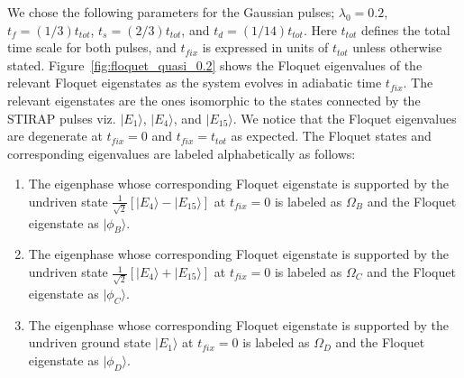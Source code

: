 \documentclass{article}
\begin{document}
We chose the following parameters for the Gaussian pulses;  $\lambda_0=0.2$, $t_f=(1/3) t_{tot}$, $t_s=(2/3)t_{tot}$, and $t_d=(1/14)t_{tot}$. Here $t_{tot}$ defines the total time scale for both pulses, and $t_{fix}$ is expressed in units of $t_{tot}$ unless otherwise stated. Figure~\ref{fig:floquet_quasi_0.2} shows the Floquet eigenvalues of the relevant Floquet eigenstates as the system evolves in adiabatic time $t_{fix}$. The relevant eigenstates are the ones isomorphic to the states connected by the STIRAP pulses viz. $|E_1\rangle$, $|E_4\rangle$, and $|E_{15}\rangle$. We notice that the Floquet eigenvalues are degenerate at $t_{fix}=0$ and $t_{fix}=t_{tot}$ as expected.  The Floquet states and corresponding eigenvalues are labeled alphabetically as follows:
\begin{enumerate}
\item
The eigenphase whose corresponding Floquet eigenstate is supported by the undriven state $\frac{1}{\sqrt{2}}\left[|E_4\rangle - |E_{15}\rangle \right]$ at $t_{fix}=0$ is labeled as $\Omega_B$ and the Floquet eigenstate as $|\phi_B\rangle$.
\item
The eigenphase whose corresponding Floquet eigenstate is supported by the undriven state $\frac{1}{\sqrt{2}}\left[|E_4\rangle + |E_{15}\rangle \right]$ at $t_{fix}=0$  is labeled as $\Omega_C$ and the Floquet eigenstate as $|\phi_C\rangle$.
\item 
The eigenphase whose corresponding Floquet eigenstate is supported by the undriven ground state $|E_1{\rangle}$  at $t_{fix}=0$ is labeled as $\Omega_D$ and the Floquet eigenstate as $|\phi_D\rangle$.
\end{enumerate}
\end{document}
